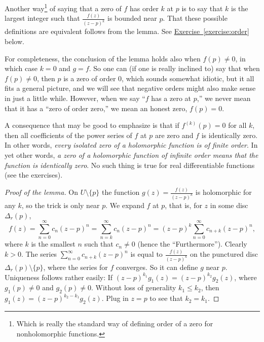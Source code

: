 \documentclass[12pt,openany]{book}
\newcommand{\myquote}[1]{``#1''}
\theoremstyle{plain}
\theoremstyle{remark}
\theoremstyle{definition}
\theoremstyle{exercise}
\theoremstyle{example}
\newcommand{\exerciseref}[1]{\hyperref[#1]{Exercise~\ref*{#1}}}
\begin{document}
Another way\footnote{Which is really the standard way of defining order of a
zero for nonholomorphic functions.}
of saying that a zero of $f$ has order $k$ at $p$ is to say that
$k$ is the largest integer such that $\frac{f(z)}{{(z-p)}^{k}}$ is bounded
near $p$.  That these possible definitions are equivalent
follows from the lemma.  See \exerciseref{exercise:order} below.

For completeness, the conclusion of the lemma holds also when $f(p) \not= 0$,
in which case
$k=0$ and $g = f$.  So one can (if one is really inclined to)
say that when $f(p) \not= 0$, then $p$ is
a zero of order $0$, which sounds somewhat idiotic, but it all fits a general
picture, and we will see that negative orders might also make sense
in just a little while.
However, when we say \myquote{$f$ has a zero at $p$,}
we never mean that it has a
\myquote{zero of order zero,} we mean an honest zero, $f(p) = 0$.

A consequence that may be good to emphasize is that if $f^{(k)}(p) = 0$
for all $k$, then all coefficients of the power series of $f$ at $p$ are
zero and $f$ is identically zero.  In other words, \emph{every isolated
zero of a holomorphic function is of finite order}.
In yet other words, \emph{a zero of a holomorphic function of
infinite order means that the function is identically zero}.
No such
thing is true for real differentiable functions (see the exercises).

\begin{proof}[Proof of the lemma]
On $U \setminus \{ p \}$ the function $g(z) = \frac{f(z)}{{(z-p)}^k}$ is
holomorphic for any $k$, so the trick is only near $p$.  We expand $f$ at
$p$,
that is, for $z$ in some disc $\Delta_r(p)$,
\begin{equation*}
f(z) =
\sum_{n=0}^\infty c_n {(z-p)}^n =
\sum_{n=k}^\infty c_n {(z-p)}^n 
= {(z-p)}^k
\sum_{n=0}^\infty c_{n+k} {(z-p)}^{n} ,
\end{equation*}
where $k$ is the smallest $n$ such that $c_n \not= 0$
(hence the \myquote{Furthermore}).
Clearly $k > 0$.
The series $\sum_{n=0}^\infty c_{n+k}{(z-p)}^n$
is equal to $\frac{f(z)}{{(z-p)}^k}$ on
the punctured disc $\Delta_r(p)\setminus \{ p \}$, where the series
for $f$ converges.
So it can define $g$ near $p$.  Uniqueness follows rather easily:
If ${(z-p)}^{k_1} g_1(z) = {(z-p)}^{k_2} g_2(z)$, where
$g_1(p) \not= 0$ and $g_2(p) \not= 0$.
Without loss of generality
$k_1 \leq k_2$, then 
$g_1(z) = {(z-p)}^{k_2-k_1} g_2(z)$.  Plug in $z=p$ to see that $k_2 =
k_1$.
\end{proof}
\end{document}
